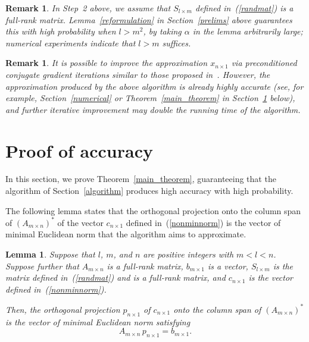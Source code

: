 \documentclass[letterpaper,12pt]{article}
\newtheorem{lemma}[theorem]{Lemma}
\newtheorem{remark1}[theorem]{Remark}
\newenvironment{remark}{\begin{remark1} \rm}{\end{remark1}}
\begin{document}
\begin{remark}
In Step~2 above, we assume that $S_{l \times m}$ defined in~(\ref{randmat})
is a full-rank matrix. Lemma~\ref{reformulation} in Section~\ref{prelims}
above guarantees this with high probability when $l > m^2$,
by taking $\alpha$ in the lemma arbitrarily large;
numerical experiments indicate that $l > m$ suffices.
\end{remark}


\begin{remark}
It is possible to improve the approximation $x_{n \times 1}$
via preconditioned conjugate gradient iterations similar to those
proposed in~\cite{rokhlin-tygert}.
However, the approximation produced by the above algorithm
is already highly accurate (see, for example, Section~\ref{numerical}
or Theorem~\ref{main_theorem} in Section~\ref{proofs} below),
and further iterative improvement may double the running time of the algorithm.
\end{remark}



\section{Proof of accuracy}
\label{proofs}

In this section, we prove Theorem~\ref{main_theorem},
guaranteeing that the algorithm of Section~\ref{algorithm}
produces high accuracy with high probability.


The following lemma states that the orthogonal projection
onto the column span of $(A_{m \times n})^*$
of the vector $c_{n \times 1}$ defined in~(\ref{nonminnorm})
is the vector of minimal Euclidean norm that the algorithm aims to approximate.

\begin{lemma}
\label{baselemma}
Suppose that $l$, $m$, and $n$ are positive integers with $m < l < n$.
Suppose further that $A_{m \times n}$ is a full-rank matrix,
$b_{m \times 1}$ is a vector,
$S_{l \times m}$ is the matrix defined in~(\ref{randmat})
and is a full-rank matrix,
and $c_{n \times 1}$ is the vector defined in~(\ref{nonminnorm}).

Then, the orthogonal projection $p_{n \times 1}$
of $c_{n \times 1}$ onto the column span of $(A_{m \times n})^*$
is the vector of minimal Euclidean norm satisfying
\begin{equation}
\label{basicproj}
A_{m \times n} \, p_{n \times 1} = b_{m \times 1}.
\end{equation}
\end{lemma}
\end{document}

